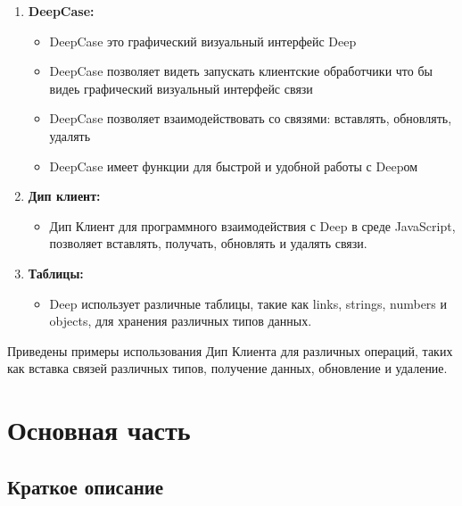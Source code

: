 \documentclass{article}
\begin{document}
\begin{enumerate}
    \item \textbf{DeepCase:}
    \begin{itemize}
        \item DeepCase это графический визуальный интерфейс Deep
        \item DeepCase позволяет видеть запускать клиентские обработчики что бы видеь графический визуальный интерфейс связи
        \item DeepCase позволяет взаимодействовать со связями: вставлять, обновлять, удалять
        \item DeepCase имеет функции для быстрой и удобной работы с Deepом
    \end{itemize}
   
    \item \textbf{Дип клиент:}
    \begin{itemize}
        \item Дип Клиент для программного взаимодействия с Deep в среде JavaScript, позволяет вставлять, получать, обновлять и удалять связи.
    \end{itemize}

    \item \textbf{Таблицы:}
    \begin{itemize}
        \item Deep использует различные таблицы, такие как links, strings, numbers и objects, для хранения различных типов данных.
    \end{itemize}
\end{enumerate}

Приведены примеры использования Дип Клиента для различных операций, таких как вставка связей различных типов, получение данных, обновление и удаление.


\tableofcontents

\section{Основная часть}

\subsection{Краткое описание}
\end{document}
